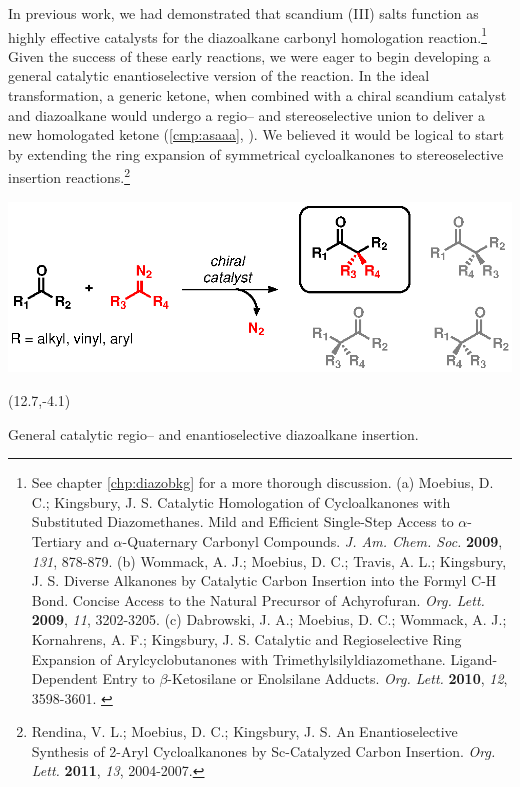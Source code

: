  In previous work, we had
 demonstrated that scandium (III) salts function as highly effective catalysts for the diazoalkane carbonyl homologation reaction.\footnote{See chapter \ref{chp:diazobkg} for a more thorough discussion. (a) {\frenchspacing Moebius, D. C.; Kingsbury, J. S. Catalytic Homologation of Cycloalkanones with Substituted Diazomethanes. Mild and Efficient
 Single-Step Access to $\alpha$-Tertiary and $\alpha$-Quaternary Carbonyl Compounds. \textit{J. Am. Chem. Soc.} \textbf{2009}, \textit{131}, 878-879.} (b) {\frenchspacing
 Wommack, A. J.; Moebius, D. C.; Travis, A. L.; Kingsbury, J. S. Diverse Alkanones by Catalytic
 Carbon Insertion into the Formyl C-H Bond. Concise Access to the Natural Precursor of Achyrofuran.
 \textit{Org. Lett.} \textbf{2009}, \textit{11}, 3202-3205.} (c) {\frenchspacing Dabrowski, J. A.;
 Moebius, D. C.; Wommack, A. J.; Kornahrens, A. F.; Kingsbury, J. S. Catalytic and Regioselective
 Ring Expansion of Arylcyclobutanones with Trimethylsilyldiazomethane. Ligand-Dependent Entry to
 $\beta$-Ketosilane or Enolsilane Adducts. \textit{Org. Lett.} \textbf{2010}, \textit{12},
 3598-3601.} \label{ref:askingsbury}} Given the success of these early reactions, we were eager to
 begin developing a general catalytic enantioselective version of the reaction. In the ideal transformation, a generic
 ketone, when combined with a chiral scandium catalyst and diazoalkane would undergo a regio-- and
 stereoselective union to deliver a new homologated ketone (\ce{->}\ref{cmp:asaaa}, ).
 We believed it would be logical to start by extending the ring expansion of symmetrical
 cycloalkanones to stereoselective insertion reactions.\footnote{{\frenchspacing Rendina, V. L.;
 Moebius, D. C.; Kingsbury, J. S. An Enantioselective Synthesis of 2-Aryl Cycloalkanones by
 Sc-Catalyzed Carbon Insertion. \textit{Org. Lett.} \textbf{2011}, \textit{13}, 2004-2007.}} 
  \begin{Scheme}[h]
  \centering \includegraphics[scale=0.8]{chp_asymmetric/images/generalrxn}
  \begin{textblock}{1}(12.7,-4.1)  \end{textblock}
  \caption{General catalytic regio-- and enantioselective diazoalkane insertion.}
  \label{sch:generalrxn}
\end{Scheme}   
